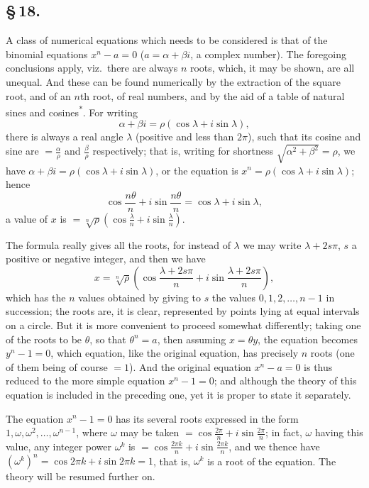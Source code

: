 \documentclass[11pt,a4paper]{article}
\begin{document}
\subsection*{\S\,18.}

A class of numerical equations which needs to be considered is that of the binomial equations $x^{n} - a = 0$ ($a = \alpha + \beta i$, a complex number). The foregoing conclusions apply, viz.\ there are always $n$ roots, which, it may be shown, are all unequal. And these can be found numerically by the extraction of the square root, and of an $n$th root, of real numbers, and by the aid of a table of natural sines and cosines\textsuperscript{*}. For writing
\[
\alpha + \beta i = \rho(\cos\lambda + i\sin\lambda),
\]
there is always a real angle $\lambda$ (positive and less than $2\pi$), such that its cosine and sine are $= \frac{\alpha}{\rho}$ and $\frac{\beta}{\rho}$ respectively; that is, writing for shortness $\sqrt{\alpha^{2} + \beta^{2}} = \rho$, we have $\alpha + \beta i = \rho(\cos\lambda + i\sin\lambda)$, or the equation is $x^{n} = \rho(\cos\lambda + i\sin\lambda)$; hence
\[
\cos\frac{n\theta}{n} + i\sin\frac{n\theta}{n} = \cos\lambda + i\sin\lambda,
\]
a value of $x$ is $= \sqrt[n]{\rho}\left(\cos\frac{\lambda}{n} + i\sin\frac{\lambda}{n}\right)$.

The formula really gives all the roots, for instead of $\lambda$ we may write $\lambda + 2s\pi$, $s$ a positive or negative integer, and then we have
\[
x = \sqrt[n]{\rho}\left(\cos\frac{\lambda + 2s\pi}{n} + i\sin\frac{\lambda + 2s\pi}{n}\right),
\]
which has the $n$ values obtained by giving to $s$ the values $0, 1, 2, \ldots, n-1$ in succession; the roots are, it is clear, represented by points lying at equal intervals on a circle. But it is more convenient to proceed somewhat differently; taking one of the roots to be $\theta$, so that $\theta^{n} = a$, then assuming $x = \theta y$, the equation becomes $y^{n} - 1 = 0$, which equation, like the original equation, has precisely $n$ roots (one of them being of course $= 1$). And the original equation $x^{n} - a = 0$ is thus reduced to the more simple equation $x^{n} - 1 = 0$; and although the theory of this equation is included in the preceding one, yet it is proper to state it separately.

The equation $x^{n} - 1 = 0$ has its several roots expressed in the form $1, \omega, \omega^{2}, \ldots, \omega^{n-1}$, where $\omega$ may be taken $= \cos\frac{2\pi}{n} + i\sin\frac{2\pi}{n}$; in fact, $\omega$ having this value, any integer power $\omega^{k}$ is $= \cos\frac{2\pi k}{n} + i\sin\frac{2\pi k}{n}$, and we thence have $(\omega^{k})^{n} = \cos 2\pi k + i\sin 2\pi k = 1$, that is, $\omega^{k}$ is a root of the equation. The theory will be resumed further on.
\end{document}
